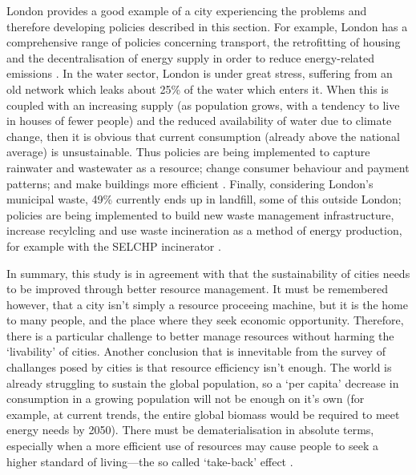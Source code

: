 London provides a good example of a city experiencing the problems and therefore developing policies described in this section. For example, London has a comprehensive range of policies concerning transport, the retrofitting of housing and the decentralisation of energy supply in order to reduce energy-related emissions \citep{Davis2011}. In the water sector, London is under great stress, suffering from an old network which leaks about 25\% of the water which enters it. When this is coupled with an increasing supply (as population grows, with a tendency to live in houses of fewer people) and the reduced availability of water due to climate change, then it is obvious that current consumption (already above the national average) is unsustainable. Thus policies are being implemented to capture rainwater and wastewater as a resource; change consumer behaviour and payment patterns; and make buildings more efficient \citep{Nickson2011}. Finally, considering London's municipal waste, 49\% currently ends up in landfill, some of this outside London; policies are being implemented to build new waste management infrastructure, increase recylcling and use waste incineration as a method of energy production, for example with the SELCHP incinerator \citep{Zabal2011}.

In summary, this study is in agreement with \citet{Newman1999} that the sustainability of cities needs to be improved through better resource management. It must be remembered however, that a city isn't simply a resource proceeing machine, but it is the home to many people, and the place where they seek economic opportunity.  Therefore, there is a particular challenge to better manage resources without harming the `livability' of cities. Another conclusion that is innevitable from the survey of challanges posed by cities is that resource efficiency isn't enough. The world is already struggling to sustain the global population, so a `per capita' decrease in consumption in a growing population will not be enough on it's own (for example, at current trends, the entire global biomass would be required to meet energy needs by 2050). There must be dematerialisation in absolute terms, especially when a more efficient use of resources may cause people to seek a higher standard of living---the so called `take-back' effect \citep{Winiwater2011}.


